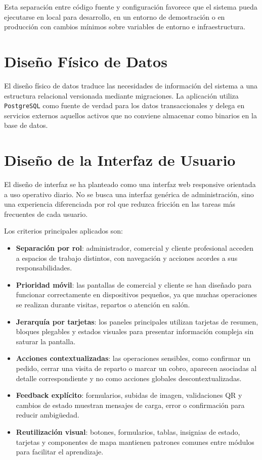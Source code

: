 Esta separación entre código fuente y configuración favorece que el sistema pueda ejecutarse en local para desarrollo, en un entorno de demostración o en producción con cambios mínimos sobre variables de entorno e infraestructura.

\section{Diseño Físico de Datos}
\label{sec:storageDesign}

El diseño físico de datos traduce las necesidades de información del sistema a una estructura relacional versionada mediante migraciones. La aplicación utiliza \texttt{PostgreSQL} como fuente de verdad para los datos transaccionales y delega en servicios externos aquellos activos que no conviene almacenar como binarios en la base de datos.



\section{Diseño de la Interfaz de Usuario} 
El diseño de interfaz se ha planteado como una interfaz web responsive orientada a uso operativo diario. No se busca una interfaz genérica de administración, sino una experiencia diferenciada por rol que reduzca fricción en las tareas más frecuentes de cada usuario.

Los criterios principales aplicados son:

\begin{itemize}
    \item \textbf{Separación por rol}: administrador, comercial y cliente profesional acceden a espacios de trabajo distintos, con navegación y acciones acordes a sus responsabilidades.
    \item \textbf{Prioridad móvil}: las pantallas de comercial y cliente se han diseñado para funcionar correctamente en dispositivos pequeños, ya que muchas operaciones se realizan durante visitas, repartos o atención en salón.
    \item \textbf{Jerarquía por tarjetas}: los paneles principales utilizan tarjetas de resumen, bloques plegables y estados visuales para presentar información compleja sin saturar la pantalla.
    \item \textbf{Acciones contextualizadas}: las operaciones sensibles, como confirmar un pedido, cerrar una visita de reparto o marcar un cobro, aparecen asociadas al detalle correspondiente y no como acciones globales descontextualizadas.
    \item \textbf{Feedback explícito}: formularios, subidas de imagen, validaciones QR y cambios de estado muestran mensajes de carga, error o confirmación para reducir ambigüedad.
    \item \textbf{Reutilización visual}: botones, formularios, tablas, insignias de estado, tarjetas y componentes de mapa mantienen patrones comunes entre módulos para facilitar el aprendizaje.
\end{itemize}

